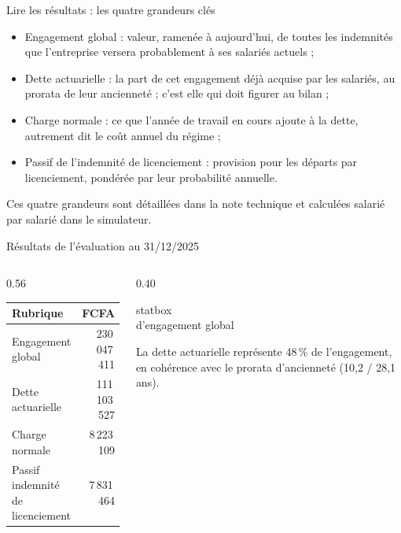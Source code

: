 \documentclass[aspectratio=169,11pt]{beamer}
\newcommand{\stat}[2]{%
  \begin{beamercolorbox}[wd=\linewidth,ht=1.5cm,dp=0.8cm,center,rounded=true]{statbox}%
    \centering{\LARGE\bfseries\textcolor{orangeC}{#1}}\\[0.15cm]
    {\small\textcolor{encre}{#2}}%
  \end{beamercolorbox}}
\begin{document}
\begin{frame}{Lire les résultats : les quatre grandeurs clés}
  \vspace{0.2cm}
  \begin{itemize}\itemsep0.25cm
    \item \textcolor{orangeC}{Engagement global} : valeur, ramenée à
          aujourd'hui, de toutes les indemnités que l'entreprise versera
          probablement à ses salariés actuels ;
    \item \textcolor{orangeC}{Dette actuarielle} : la part de cet engagement
          déjà acquise par les salariés, au prorata de leur ancienneté ;
          c'est elle qui doit figurer au bilan ;
    \item \textcolor{orangeC}{Charge normale} : ce que l'année de travail en
          cours ajoute à la dette, autrement dit le coût annuel du régime ;
    \item \textcolor{orangeC}{Passif de l'indemnité de licenciement} :
          provision pour les départs par licenciement, pondérée par leur
          probabilité annuelle.
  \end{itemize}
  \vspace{0.2cm}
  \small Ces quatre grandeurs sont détaillées dans la note technique et
  calculées salarié par salarié dans le simulateur.
\end{frame}

\begin{frame}{Résultats de l'évaluation au 31/12/2025}
  \vspace{0.2cm}
  \begin{columns}[T]
    \begin{column}{0.56\textwidth}
      \begin{tabular}{lr}
        \toprule
        \rowcolor{orangeM} Rubrique & FCFA \\
        \midrule
        Engagement global & 230\,047\,411 \\
        Dette actuarielle & 111\,103\,527 \\
        Charge normale & 8\,223\,109 \\
        Passif indemnité de licenciement & 7\,831\,464 \\
        \bottomrule
      \end{tabular}
    \end{column}
    \begin{column}{0.40\textwidth}
      \stat{230 M FCFA}{d'engagement global}
      \vspace{0.2cm}
      {\small La dette actuarielle représente 48\,\% de l'engagement, en
      cohérence avec le prorata d'ancienneté (10,2 / 28,1 ans).}
    \end{column}
  \end{columns}
\end{frame}
\end{document}

